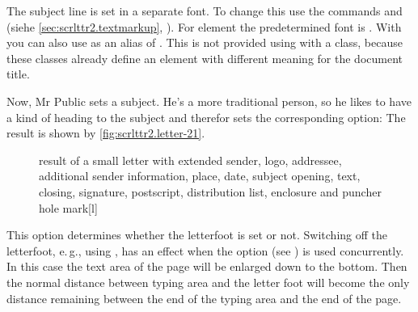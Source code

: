 %
%
The subject line is set in a separate font. To change this
use the commands  and
 (siehe
\autoref{sec:scrlttr2.textmarkup},
). For element
 the
predetermined font is . With
 you can also use
 as an alias of
. This is not provided using 
with a \KOMAScript{} class, because these classes already define an element
 with different meaning for the document title.%
%
%
\begin{Example}
  Now, Mr Public sets a subject. He's a more traditional person, so he likes
  to have a kind of heading to the subject and therefor sets the corresponding
  option:%
  The result is shown by \autoref{fig:scrlttr2.letter-21}.
  \begin{figure}
    \setcapindent{0pt}%
    \begin{captionbeside}
      {result of a small letter with extended sender, logo, addressee,
        additional sender information, place, date, subject opening, text,
        closing, signature, postscript, distribution list, enclosure and
        puncher hole mark}[l]
    \end{captionbeside}
    \label{fig:scrlttr2.letter-21}
  \end{figure}
\end{Example}
%
\EndIndexGroup


\begin{Declaration}
\end{Declaration}
%
%
This option determines whether the
letterfoot is set or not. Switching off the letterfoot, e.\,g., using
, has
an effect when the option  (see
) is used concurrently. In
this case the text area of the page will be enlarged down to the bottom. Then
the normal distance between typing area and the letter foot will become the
only distance remaining between the end of the typing area and the end of
the page.

